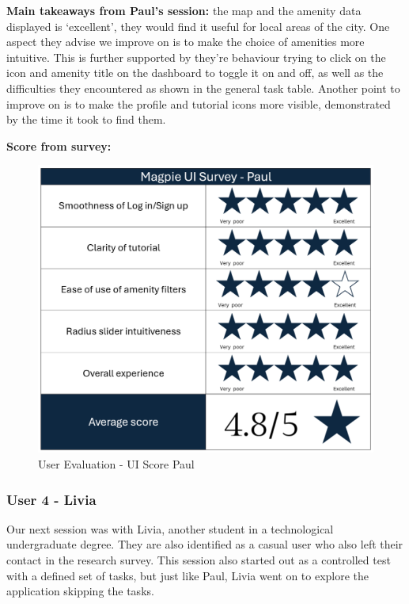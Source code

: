 \textbf{Main takeaways from Paul's session: }the map and the amenity data
displayed is `excellent', they would find it useful for local areas of the city.
One aspect they advise we improve on is to make the choice of amenities more
intuitive. This is further supported by they're behaviour trying to click on the
icon and amenity title on the dashboard to toggle it on and off, as well as the
difficulties they encountered as shown in the general task table. Another point
to improve on is to make the profile and tutorial icons more visible,
demonstrated by the time it took to find them.

\newpage{}

\noindent\textbf{Score from survey: }

\begin{figure}[h!]
    \centering
    \includegraphics[width=\textwidth]{images/survey-paul.png}
    \caption{User Evaluation - UI Score Paul}
\end{figure}

\newpage{}

\subsubsection{User 4 - Livia}
Our next session was with Livia, another student in a technological
undergraduate degree. They are also identified as a casual user who also left
their contact in the research survey. This session also started out as a
controlled test with a defined set of tasks, but just like Paul, Livia went on
to explore the application skipping the tasks.

